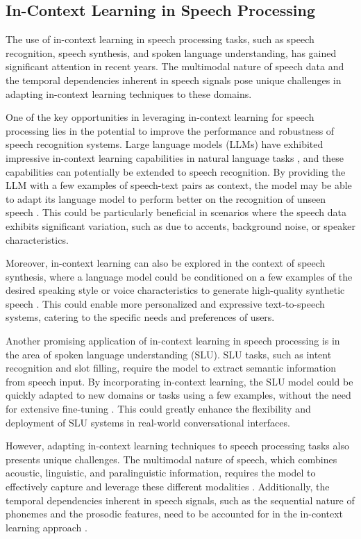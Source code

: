 \documentclass[11pt]{article}
\begin{document}
\subsection{In-Context Learning in Speech Processing}

The use of in-context learning in speech processing tasks, such as speech recognition, speech synthesis, and spoken language understanding, has gained significant attention in recent years. The multimodal nature of speech data and the temporal dependencies inherent in speech signals pose unique challenges in adapting in-context learning techniques to these domains.

One of the key opportunities in leveraging in-context learning for speech processing lies in the potential to improve the performance and robustness of speech recognition systems. Large language models (LLMs) have exhibited impressive in-context learning capabilities in natural language tasks \cite{ref268}, and these capabilities can potentially be extended to speech recognition. By providing the LLM with a few examples of speech-text pairs as context, the model may be able to adapt its language model to perform better on the recognition of unseen speech \cite{ref269}. This could be particularly beneficial in scenarios where the speech data exhibits significant variation, such as due to accents, background noise, or speaker characteristics.

Moreover, in-context learning can also be explored in the context of speech synthesis, where a language model could be conditioned on a few examples of the desired speaking style or voice characteristics to generate high-quality synthetic speech \cite{ref270}. This could enable more personalized and expressive text-to-speech systems, catering to the specific needs and preferences of users.

Another promising application of in-context learning in speech processing is in the area of spoken language understanding (SLU). SLU tasks, such as intent recognition and slot filling, require the model to extract semantic information from speech input. By incorporating in-context learning, the SLU model could be quickly adapted to new domains or tasks using a few examples, without the need for extensive fine-tuning \cite{ref271}. This could greatly enhance the flexibility and deployment of SLU systems in real-world conversational interfaces.

However, adapting in-context learning techniques to speech processing tasks also presents unique challenges. The multimodal nature of speech, which combines acoustic, linguistic, and paralinguistic information, requires the model to effectively capture and leverage these different modalities \cite{ref272}. Additionally, the temporal dependencies inherent in speech signals, such as the sequential nature of phonemes and the prosodic features, need to be accounted for in the in-context learning approach \cite{ref273}.
\end{document}
